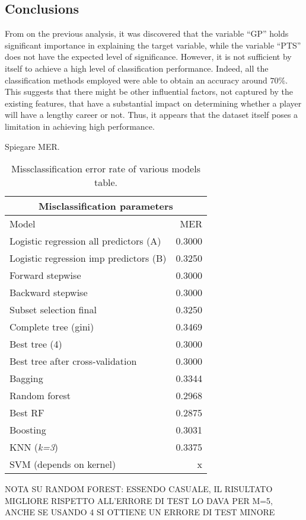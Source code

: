 \subsection{Conclusions}

From on the previous analysis, it was discovered that the variable ``GP'' holds significant importance in explaining the target variable, while the variable ``PTS'' does not have the expected level of significance. 
However, it is not sufficient by itself to achieve a high level of classification performance.
Indeed, all the classification methods employed were able to obtain an accuracy around $70\%$. This suggests that there might be other influential factors, not captured by the existing features, that have a substantial impact on determining whether a player will have a lengthy career or not. Thus, it appears that the dataset itself poses a limitation in achieving high performance.

Spiegare MER.

\begin{table}[H]
	\centering
	\begin{tabular}{|| l | r ||} 
		\hline
		\multicolumn{2}{|c|}{Misclassification parameters} \\
		\hline
		Model & MER \\
		\hline
		Logistic regression all predictors (A) & 0.3000 \\
		\hline
		Logistic regression imp predictors (B) & 0.3250 \\
		\hline
		Forward stepwise & 0.3000 \\
		\hline
		Backward stepwise & 0.3000 \\
		\hline
		Subset selection final & 0.3250 \\
		\hline
		Complete tree (gini) & 0.3469 \\
		\hline
		Best tree (4) & 0.3000 \\
		\hline
		Best tree after cross-validation & 0.3000 \\ 
		\hline
		Bagging & 0.3344 \\
		\hline
		Random forest & 0.2968 \\
		\hline
		Best RF & 0.2875 \\
		\hline
		Boosting & 0.3031 \\
		\hline
		KNN (\textit{k=3}) & 0.3375 \\
		\hline
		SVM (depends on kernel)& x \\
		\hline
	\end{tabular}
	\caption{Missclassification error rate of various models table.}
	\label{table:ClasEvalParams}
\end{table}

NOTA SU RANDOM FOREST: ESSENDO CASUALE, IL RISULTATO MIGLIORE RISPETTO ALL'ERRORE DI TEST LO DAVA PER M=5, ANCHE SE USANDO 4 SI OTTIENE UN ERRORE DI TEST MINORE
